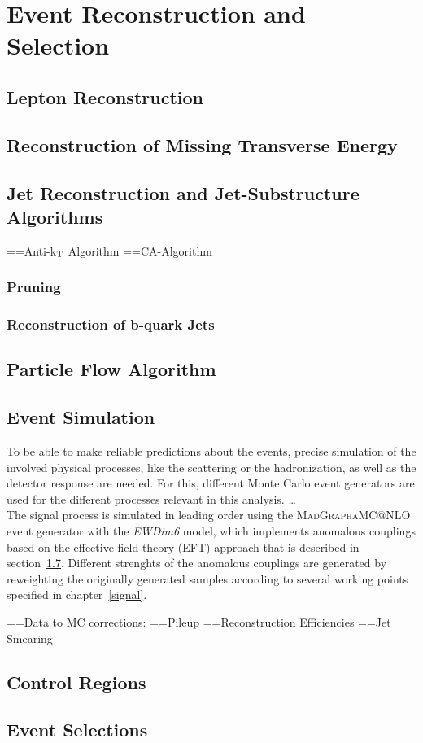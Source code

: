 \chapter{Event Reconstruction and Selection}
\label{chap::EventReconstructionandSelection}

\section{Lepton Reconstruction}
\section{Reconstruction of Missing Transverse Energy}
\section{Jet Reconstruction and Jet-Substructure Algorithms}
==Anti-k$_{\rm T}$ Algorithm
==CA-Algorithm
\subsection{Pruning}
\label{sec:pruning}
\subsection{Reconstruction of b-quark Jets}
\section{Particle Flow Algorithm}
\section{Event Simulation}
\label{sec:MC}
To be able to make reliable predictions about the events, precise simulation of the involved physical processes, like the scattering or the hadronization, as well as the detector response are needed. For this, different Monte Carlo event generators are used for the different processes relevant in this analysis.
\dots \\
The signal process is simulated in leading order using the \textsc{MadGraph\textunderscore aMC@NLO} event generator with the \textit{EWDim6} model\cite{madgraph}, which implements anomalous couplings based on the effective field theory (EFT) approach that is described in section~\ref{}. Different strenghts of the anomalous couplings are generated by reweighting the originally generated samples according to several working points specified in chapter~\ref{signal}.


=={Data to MC corrections:}
=={Pileup}
=={Reconstruction Efficiencies}
=={Jet Smearing}
\section{Control Regions}
\section{Event Selections}

